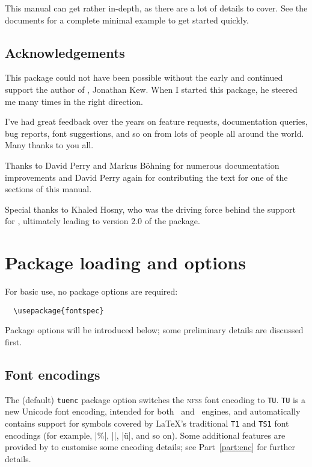 \documentclass[a4paper]{l3doc}
\begin{document}
This manual can get rather in-depth, as there are a lot of details
to cover. See the documents  for a complete minimal example
to get started quickly.


\subsection{Acknowledgements}

This package could not have been possible without the early and continued support
the author of \XeTeX, Jonathan Kew. When I started this package, he steered
me many times in the right direction.

I've had great
feedback over the years on feature requests, documentation queries, bug reports, font suggestions, and so on from lots of people all around the world.
Many thanks to you all.

Thanks to David Perry and Markus B\"ohning for numerous documentation
improvements and David Perry again for contributing the text for one of the
sections of this manual.

Special thanks to Khaled Hosny, who was the driving force behind the support for \LuaLaTeX, ultimately leading to version 2.0 of the package.



\section{Package loading and options}

For basic use, no package options are required:
\begin{Verbatim}
  \usepackage{fontspec}
\end{Verbatim}
Package options will be introduced below; some preliminary details are discussed first.


\subsection{Font encodings}

The (default) \texttt{tuenc} package option switches the \textsc{nfss} font encoding to \texttt{TU}.
\texttt{TU} is a new Unicode font encoding, intended for both \XeTeX\ and \LuaTeX\ engines, and automatically contains support for symbols covered by \LaTeX's traditional \texttt{T1} and \texttt{TS1} font encodings (for example, |\%|, |\textbullet|, |\"u|, and so on).
Some additional features are provided by  to customise some encoding details; see Part~\vref{part:enc} for further details.
\end{document}
